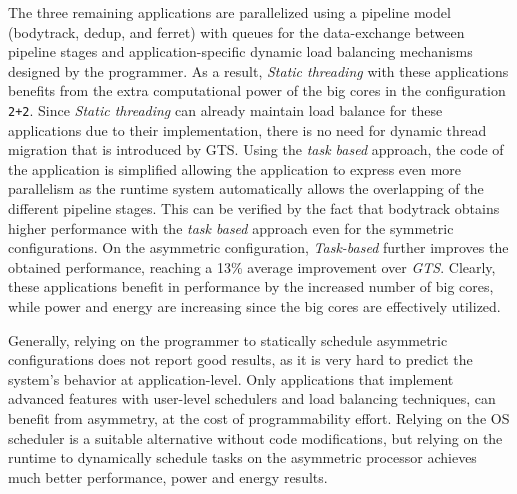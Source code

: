 The three remaining applications are parallelized using a pipeline model (bodytrack, dedup, and ferret)  with queues for the data-exchange between pipeline stages and application-specific dynamic load balancing mechanisms designed by the programmer.
As a result, \emph{Static threading} with these applications benefits from the extra computational power of the big cores in the configuration \texttt{2+2}. 
Since \emph{Static threading} can already maintain load balance for these applications due to their implementation, there is no need for dynamic thread migration that is introduced by GTS.
Using the \emph{task based} approach, the code of the application is simplified allowing the application to express even more parallelism as the runtime system automatically allows the overlapping of the different pipeline stages. 
This can be verified by the fact that bodytrack obtains higher performance with the \emph{task based} approach even for the symmetric configurations.
On the asymmetric configuration, \emph{Task-based} further improves the obtained performance, reaching a 13\% average improvement over \emph{GTS}. 
Clearly, these applications benefit in performance by the increased number of big cores, while power and energy are increasing since the big cores are effectively utilized.



Generally, relying on the programmer to statically schedule asymmetric configurations does not report good results, as it is very hard to predict the system's behavior at application-level. 
Only applications that implement advanced features with user-level schedulers and load balancing techniques, can benefit from asymmetry, at the cost of programmability effort.
Relying on the OS scheduler is a suitable alternative without code modifications, but relying on the runtime to dynamically schedule tasks on the asymmetric processor achieves much better performance, power and energy results.

